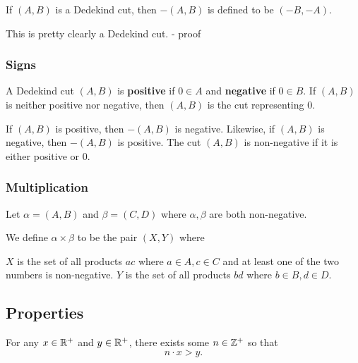 If $(A,B)$ is a Dedekind cut, then $-(A,B)$ is defined to be
$(-B,-A)$.

This is pretty clearly a Dedekind cut. - proof

\subsubsection{Signs}
A Dedekind cut $(A,B)$ is \textbf{positive} if $0 \in A$ and \textbf{negative} if $0 \in B$. If $(A,B)$ is neither positive nor negative, then $(A,B)$ is the cut representing 0.

If $(A,B)$ is positive, then $-(A,B)$ is negative. Likewise, if $(A,B)$ is negative, then $-(A,B)$ is positive. The cut $(A,B)$ is non-negative if it is either positive or 0.

\subsubsection{Multiplication}

Let $\alpha = (A,B)$ and $\beta = (C,D)$ where $\alpha, \beta$ are both non-negative.

We define $\alpha \times \beta$ to be the pair $(X,Y)$ where

$X$ is the set of all products $ac$ where $a \in A, c \in C$ and at least one of the two numbers is non-negative. 
$Y$ is the set of all products $bd$ where $b \in B, d \in D$.




\subsection{Properties}
\begin{theorem}[$\RR$ is archimedian]\label{thrm:r-archimedian}
For any $x\in\mathbb R^+$ and $y\in\mathbb R^+$, there exists some $n\in\mathbb Z^+$ so that
\[n\cdot x>y.\]
\end{theorem}

